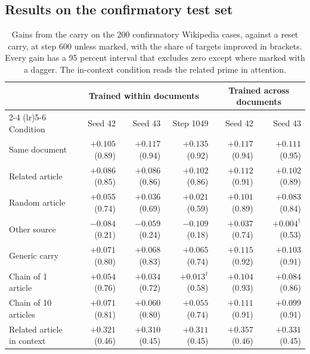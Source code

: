 \documentclass[12pt,a4paper]{report}
\begin{document}
\subsection{Results on the confirmatory test set}
\label{sec-confirmatory}

\begin{table}[H]
  \centering
  \caption{Gains from the carry on the 200 confirmatory Wikipedia cases, against a reset carry, at step 600 unless marked, with the share of targets improved in brackets. Every gain has a 95 percent interval that excludes zero except where marked with a dagger. The in-context condition reads the related prime in attention.}
  \label{tab-confirmatory}
  \small
  \footnotesize
  \begin{tabular}{lrrrrr}
    \toprule
    & \multicolumn{3}{c}{Trained within documents} & \multicolumn{2}{c}{Trained across documents} \\
    \cmidrule(lr){2-4} \cmidrule(lr){5-6}
    Condition & Seed 42 & Seed 43 & Step 1049 & Seed 42 & Seed 43 \\
    \midrule
    Same document & $+0.105$ (0.89) & $+0.117$ (0.94) & $+0.135$ (0.92) & $+0.117$ (0.94) & $+0.111$ (0.95) \\
    Related article & $+0.086$ (0.85) & $+0.086$ (0.86) & $+0.102$ (0.86) & $+0.112$ (0.91) & $+0.102$ (0.89) \\
    Random article & $+0.055$ (0.74) & $+0.036$ (0.69) & $+0.021$ (0.59) & $+0.101$ (0.89) & $+0.083$ (0.84) \\
    Other source & $-0.084$ (0.21) & $-0.059$ (0.24) & $-0.109$ (0.18) & $+0.037$ (0.74) & $+0.004^{\dagger}$ (0.53) \\
    Generic carry & $+0.071$ (0.80) & $+0.068$ (0.83) & $+0.065$ (0.74) & $+0.115$ (0.92) & $+0.103$ (0.91) \\
    Chain of 1 article & $+0.054$ (0.76) & $+0.034$ (0.72) & $+0.013^{\dagger}$ (0.58) & $+0.104$ (0.93) & $+0.084$ (0.86) \\
    Chain of 10 articles & $+0.071$ (0.81) & $+0.060$ (0.80) & $+0.055$ (0.74) & $+0.111$ (0.91) & $+0.099$ (0.91) \\
    Related article in context & $+0.321$ (0.46) & $+0.310$ (0.45) & $+0.311$ (0.45) & $+0.357$ (0.46) & $+0.331$ (0.45) \\
    \bottomrule
  \end{tabular}
\end{table}
\end{document}
